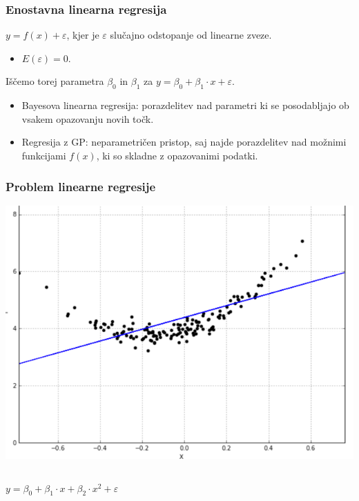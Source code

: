 \documentclass{beamer}
\begin{document}
\begin{frame}\frametitle{Enostavna linearna regresija}

$ y= f(x) + \varepsilon $, kjer je $\varepsilon$ slučajno odstopanje od linearne zveze.
\begin{itemize}
\item  $ E(\varepsilon) = 0. $
\end{itemize}
Iščemo torej parametra $ \beta_0 $ in $\beta_1$ za $ y= \beta_0 + \beta_1 \cdot x + \varepsilon$.
\begin{itemize}
\item Bayesova linearna regresija: porazdelitev nad parametri ki se posodabljajo ob vsakem opazovanju novih točk.
\item Regresija z GP: \alert{neparametričen} pristop, saj najde porazdelitev nad možnimi funkcijami $f(x)$, ki so skladne z opazovanimi podatki.
\end{itemize}


\end{frame}
\begin{frame}
\frametitle{Problem linearne regresije}

\includegraphics[scale=0.5]{problem} \pause

\begin{columns}
\begin{column}{7cm}

 $ y= \beta_0 + \beta_1 \cdot x + \beta_2 \cdot x^2 + \varepsilon$
\end{column}


\end{columns}


\end{frame}
\end{document}
